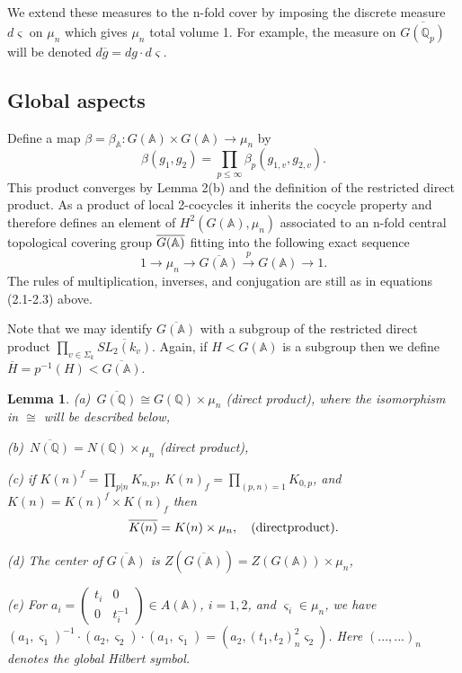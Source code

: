\documentclass[12pt]{article}
\newtheorem{lemma}[theorem]{Lemma}
\def\aaa{\mathbb{A}}
\def\qqq{\mathbb{Q}}
\begin{document}
We extend these measures to the n-fold cover by imposing the discrete
measure $d\varsigma $ on $\mu _n$ which gives $\mu _n$ total volume 1. For
example, the measure on $\overline{G(\qqq_p)}$ will be denoted $d%
\overline{g}=dg\cdot d\varsigma $.

\subsection{Global aspects}

Define a map $\beta =\beta _{\aaa }:G(\aaa )\times G(\aaa )\rightarrow
\mu _n$ by 
\[
\beta (g_1,g_2)=\prod_{p\leq \infty }\beta _p(g_{1,v},g_{2,v}).
\]
This product converges by Lemma 2(b) and the definition of the restricted
direct product. As a product of local 2-cocycles it inherits the cocycle
property and therefore defines an element of $H^2(G(\aaa ),\mu _n)$
associated to an n-fold central topological covering group $\overline{G(\mathbb{%
A})}$ fitting into the following exact sequence 
\begin{equation}
1\rightarrow \mu _n\rightarrow \overline{G(\aaa )}\stackrel{p}{\rightarrow 
}G(\aaa )\rightarrow 1.
\end{equation}
The rules of multiplication, inverses, and conjugation are still as in
equations (2.1-2.3) above.

Note that we may identify $\overline{G(\aaa )}$ with a subgroup of the
restricted direct product
$\prod_{v\in \Sigma _k}\overline{SL_2(k_v)}$. Again,
if $H<G(\aaa )$ is a subgroup then we define
$\overline{H}=p^{-1}(H)<\overline{G(\aaa )}$.

\begin{lemma}
(a)\ $\overline{G(\qqq)}\cong G(\qqq)\times \mu _n$
(direct product), where the isomorphism in $\cong$ will be
described below,

(b)\ $\overline{N(\qqq)}=N(\qqq)\times \mu _n$ (direct product),

(c) if $K(n)^f=\prod_{p|n}K_{n,p}$, $K(n)_f=\prod_{(p,n)=1}K_{0,p}$, and
$K(n)=K(n)^f\times K(n)_f$ then 
\[
\overline{K(n)}=K(n)\times \mu _n,
\ \ \ {\rm (direct product)}.
\]

(d) The center of $\overline{G(\aaa )}$ is
$Z(\overline{G(\aaa )})=Z(G({\aaa }))\times \mu _n$,

(e) For $a_i=\left( 
\begin{array}{cc}
t_i & 0 \\ 
0 & t_i^{-1}
\end{array}
\right) \in A(\aaa )$, $i=1,2$, and $\varsigma _i\in \mu _n$, we have $%
(a_1,\varsigma _1)^{-1}\cdot (a_2,\varsigma _2)\cdot (a_1,\varsigma
_1)=(a_2,(t_1,t_2)_n^2\varsigma _2)$. Here $(...,...)_n$ denotes the global
Hilbert symbol.
\end{lemma}
\end{document}
